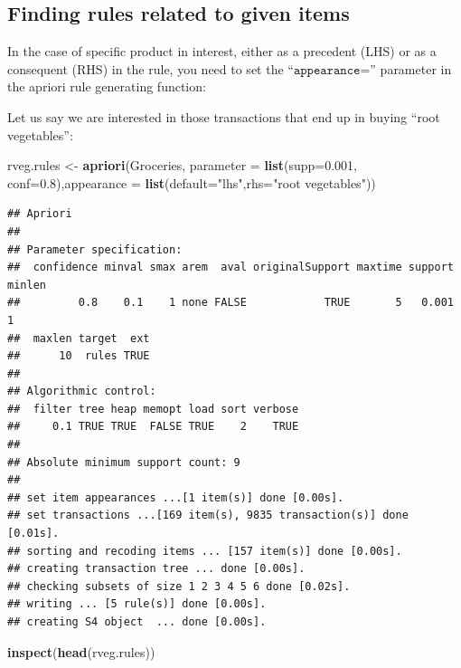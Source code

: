 \documentclass[
]{book}
\newenvironment{Shaded}{\begin{snugshade}}{\end{snugshade}}
\newcommand{\DataTypeTok}[1]{\textcolor[rgb]{0.13,0.29,0.53}{#1}}
\newcommand{\FloatTok}[1]{\textcolor[rgb]{0.00,0.00,0.81}{#1}}
\newcommand{\KeywordTok}[1]{\textcolor[rgb]{0.13,0.29,0.53}{\textbf{#1}}}
\newcommand{\NormalTok}[1]{#1}
\newcommand{\StringTok}[1]{\textcolor[rgb]{0.31,0.60,0.02}{#1}}
\begin{document}
\hypertarget{finding-rules-related-to-given-items}{%
\subsection{Finding rules related to given items}\label{finding-rules-related-to-given-items}}

In the case of specific product in interest, either as a precedent (LHS) or as a consequent (RHS) in the rule, you need to set the ``\(\texttt{appearance=}\)'' parameter in the apriori rule generating function:

Let us say we are interested in those transactions that end up in buying ``root vegetables'':

\begin{Shaded}
\begin{Highlighting}[]
\NormalTok{rveg.rules <-}\StringTok{ }\KeywordTok{apriori}\NormalTok{(Groceries, }\DataTypeTok{parameter =} \KeywordTok{list}\NormalTok{(}\DataTypeTok{supp=}\FloatTok{0.001}\NormalTok{, }\DataTypeTok{conf=}\FloatTok{0.8}\NormalTok{),}\DataTypeTok{appearance =} \KeywordTok{list}\NormalTok{(}\DataTypeTok{default=}\StringTok{"lhs"}\NormalTok{,}\DataTypeTok{rhs=}\StringTok{"root vegetables"}\NormalTok{))}
\end{Highlighting}
\end{Shaded}

\begin{verbatim}
## Apriori
## 
## Parameter specification:
##  confidence minval smax arem  aval originalSupport maxtime support minlen
##         0.8    0.1    1 none FALSE            TRUE       5   0.001      1
##  maxlen target  ext
##      10  rules TRUE
## 
## Algorithmic control:
##  filter tree heap memopt load sort verbose
##     0.1 TRUE TRUE  FALSE TRUE    2    TRUE
## 
## Absolute minimum support count: 9 
## 
## set item appearances ...[1 item(s)] done [0.00s].
## set transactions ...[169 item(s), 9835 transaction(s)] done [0.01s].
## sorting and recoding items ... [157 item(s)] done [0.00s].
## creating transaction tree ... done [0.00s].
## checking subsets of size 1 2 3 4 5 6 done [0.02s].
## writing ... [5 rule(s)] done [0.00s].
## creating S4 object  ... done [0.00s].
\end{verbatim}

\begin{Shaded}
\begin{Highlighting}[]
\KeywordTok{inspect}\NormalTok{(}\KeywordTok{head}\NormalTok{(rveg.rules))}
\end{Highlighting}
\end{Shaded}
\end{document}
